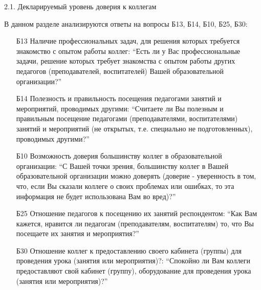 \begin{frame}{2.1. Декларируемый уровень доверия к коллегам }

\tiny

В данном разделе анализируются ответы на вопросы Б13, Б14, Б10, Б25, Б30:
\bigskip

\begin{itemize}

\item [Б13] Наличие профессиональных задач, для решения которых требуется знакомство с опытом работы коллег: ``Есть ли у Вас профессиональные задачи, решение которых требует знакомства с опытом работы других педагогов (преподавателей, воспитателей) Вашей образовательной организации?''

\item [Б14] Полезность и правильность посещения педагогами  занятий и мероприятий, проводимых другими: ``Считаете ли Вы полезным и правильным посещение педагогами (преподавателями, воспитателями)  занятий и мероприятий (не открытых, т.е. специально не подготовленных), проводимых другими?''

\item [Б10] Возможность доверия большинству коллег в образовательной организации: ``С Вашей точки зрения, большинству коллег в Вашей образовательной организации можно доверять (доверие - уверенность в том, что, если Вы сказали коллеге о своих проблемах или ошибках, то эта информация не будет использована Вам во вред)?''

\item[Б25] Отношение педагогов к посещению их занятий респондентом: ``Как Вам кажется, нравится ли педагогам (преподавателям, воспитателям) то, что Вы посещаете их занятия и мероприятия?''

\item[Б30] Отношение коллег к предоставлению своего кабинета (группы)  для проведения урока (занятия или мероприятия)?: ``Спокойно ли Вам коллеги предоставляют свой кабинет (группу), оборудование для проведения урока (занятия или мероприятия)?''

\end{itemize}

\end{frame}


